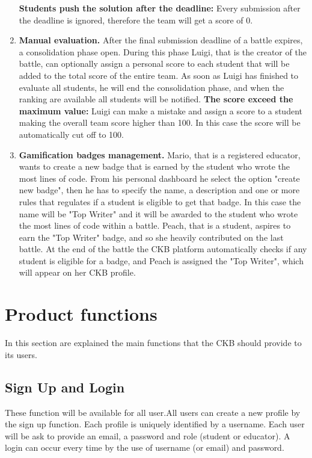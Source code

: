 \begin{enumerate}[label=\textbf{SC.\arabic*}]
    \textbf{Students push the solution after the deadline:} Every submission after the deadline is ignored, therefore the team will get a score of 0. 
    \item {} \textbf{Manual evaluation.} \newline
    After the final submission deadline of a battle expires, a consolidation phase open. During this phase Luigi, that is the creator of the battle, can optionally assign a personal score to each student that will be added to the total score of the entire team.
    As soon as Luigi has finished to evaluate all students, he will end the consolidation phase, and when the ranking are available all students will be notified.\newline
    \textbf{The score exceed the maximum value:} Luigi can make a mistake and assign a score to a student making the overall team score higher than 100. In this case the score will be automatically cut off to 100.
    \item {} \textbf{Gamification badges management.} \newline
    Mario, that is a registered educator, wants to create a new badge that is earned by the student who wrote the most lines of code. From his personal dashboard he select the option "create new badge", then he has to specify the name, a description and one or more rules that regulates if a student is eligible to get that badge. In this case the name will be "Top Writer" and it will be awarded to the student who wrote the most lines of code within a battle. \newline
    Peach, that is a student, aspires to earn the "Top Writer" badge, and so she heavily contributed on the last battle. At the end of the battle the CKB platform automatically checks if any student is eligible for a badge, and Peach is assigned the "Top Writer", which will appear on her CKB profile.
\end{enumerate}

\clearpage

\section{Product functions}\label{desc:prodFunc}
In this section are explained the main functions that the CKB should provide to its users.
\subsection{Sign Up and Login}
These function will be available for all user.\newline All users can create a new profile by the sign up function. Each profile is uniquely identified by a username. Each user will be ask to provide an email, a password and role (student or educator). \newline
A login can occur every time by the use of username (or email) and password.

